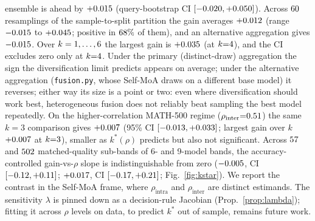 \documentclass[11pt]{article}
\theoremstyle{plain}
\theoremstyle{definition}
\begin{document}
ensemble is ahead by $+0.015$ (query-bootstrap CI $[-0.020,+0.050]$). Across $60$ resamplings of the
sample-to-split partition the gain averages $+0.012$ (range $-0.015$ to $+0.045$; positive in $68\%$ of them), and an
alternative aggregation gives $-0.015$. Over $k=1,\dots,6$ the largest gain is $+0.035$ (at $k{=}4$), and
the CI excludes zero only at $k{=}4$. Under the primary (distinct-draw) aggregation the sign the diversification limit predicts appears on average; under the alternative
aggregation (\texttt{fusion.py}, whose Self-MoA draws on a different base model) it reverses; either way its size is a point
or two: even where diversification should work best, heterogeneous fusion does not reliably beat sampling the best
model repeatedly. On the higher-correlation MATH-500 regime ($\rho_{\mathrm{inter}}{=}0.51$) the same $k{=}3$ comparison gives
$+0.007$ (95\% CI $[-0.013,+0.033]$; largest gain over $k$ $+0.007$ at $k{=}3$),
smaller as $k^\ast(\rho)$ predicts but also not significant. Across $57$ and $502$ matched-quality sub-bands of
6- and 9-model bands, the accuracy-controlled gain-vs-$\rho$ slope is indistinguishable from zero ($-0.005$, CI
$[-0.12,+0.11]$; $+0.017$, CI $[-0.17,+0.21]$; Fig.~\ref{fig:kstar}). We report the
contrast in the Self-MoA frame, where $\rho_{\mathrm{intra}}$ and $\rho_{\mathrm{inter}}$ are distinct estimands. The sensitivity
$\lambda$ is pinned down as a decision-rule Jacobian (Prop.~\ref{prop:lambda}); fitting it across $\rho$ levels on data, to
predict $k^\ast$ out of sample, remains future work.
\end{document}
